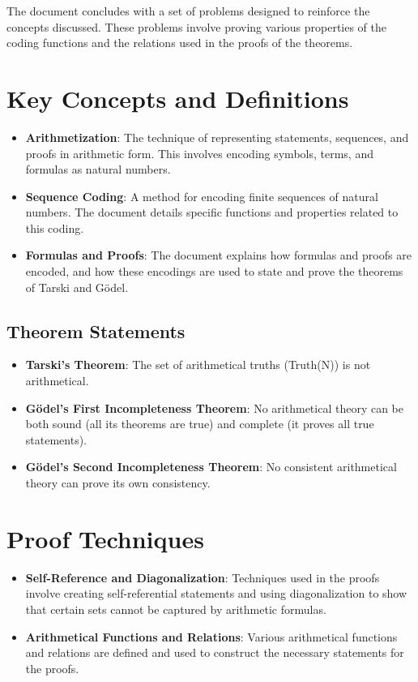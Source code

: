 \documentclass[10pt]{article}
\begin{document}
The document concludes with a set of problems designed to reinforce the concepts discussed. These problems involve proving various properties of the coding functions and the relations used in the proofs of the theorems.

\section{Key Concepts and Definitions}

\begin{itemize}
    \item \textbf{Arithmetization}: The technique of representing statements, sequences, and proofs in arithmetic form. This involves encoding symbols, terms, and formulas as natural numbers.
    \item \textbf{Sequence Coding}: A method for encoding finite sequences of natural numbers. The document details specific functions and properties related to this coding.
    \item \textbf{Formulas and Proofs}: The document explains how formulas and proofs are encoded, and how these encodings are used to state and prove the theorems of Tarski and Gödel.
\end{itemize}

\subsection{Theorem Statements}

\begin{itemize}
    \item \textbf{Tarski's Theorem}: The set of arithmetical truths (Truth(N)) is not arithmetical.
    \item \textbf{Gödel's First Incompleteness Theorem}: No arithmetical theory can be both sound (all its theorems are true) and complete (it proves all true statements).
    \item \textbf{Gödel's Second Incompleteness Theorem}: No consistent arithmetical theory can prove its own consistency.
\end{itemize}

\section{Proof Techniques}

\begin{itemize}
    \item \textbf{Self-Reference and Diagonalization}: Techniques used in the proofs involve creating self-referential statements and using diagonalization to show that certain sets cannot be captured by arithmetic formulas.
    \item \textbf{Arithmetical Functions and Relations}: Various arithmetical functions and relations are defined and used to construct the necessary statements for the proofs.
\end{itemize}
\end{document}
